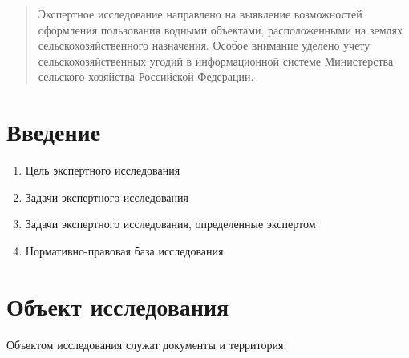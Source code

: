 
\renewcommand{\ReportTitle}{ЭКСПЕРТНЫЙ ОТЧЕТ}
\renewcommand{\ReportSubject}{по исследования землепользования Коломенского рыбхоза "Осенка"}
\renewcommand{\ReportDate}{22 апреля 2025}



\renewcommand{\HeaderText}{Экспертный отчет по землепользованию}

\pagestyle{fancy}
\maketitle

\begin{abstract}
Экспертное исследование направлено на выявление возможностей оформления пользования водными объектами, расположенными на землях сельскохозяйственного назначения. Особое внимание уделено учету сельскохозяйственных угодий в информационной системе Министерства сельского хозяйства Российской Федерации. 
\end{abstract}

\tableofcontents

\section{Введение}
\label{sec:intro}

\begin{enumerate}
    \item[] Цель экспертного исследования
    \item[] Задачи экспертного исследования
    \item[] Задачи экспертного исследования, определенные экспертом 
    \item[] Нормативно-правовая база исследования
\end{enumerate}

\section{Объект исследования}
\label{sec:obj}
Объектом исследования служат документы и территория. 

